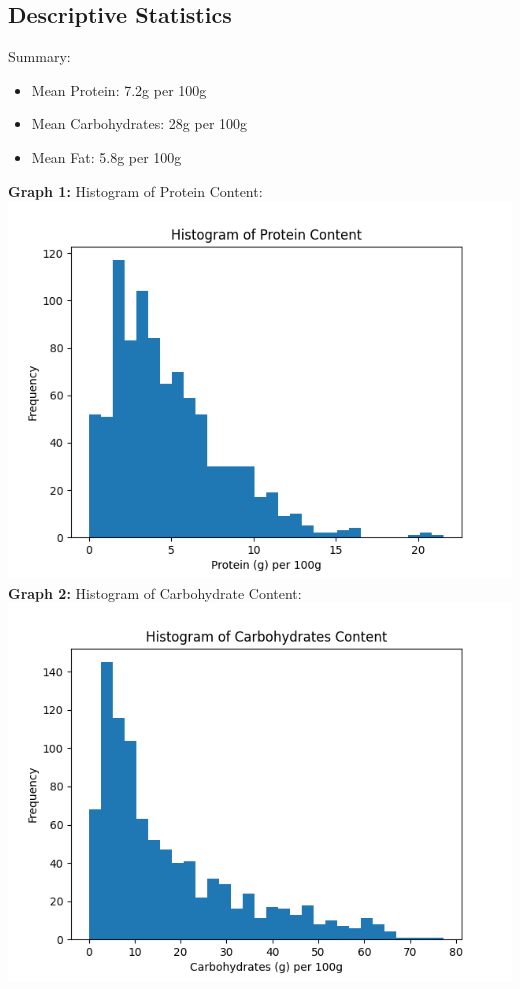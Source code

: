 \documentclass{article}
\begin{document}
\subsection*{Descriptive Statistics}
Summary:
\begin{itemize}
    \item Mean Protein: 7.2g per 100g
    \item Mean Carbohydrates: 28g per 100g
    \item Mean Fat: 5.8g per 100g
\end{itemize}

\textbf{Graph 1:} Histogram of Protein Content:\\
\includegraphics[scale = 0.75]{protein_hist.png}
\textbf{Graph 2:} Histogram of Carbohydrate Content:\\
\includegraphics[scale = 0.75]{carbs_hist.png}
\end{document}
